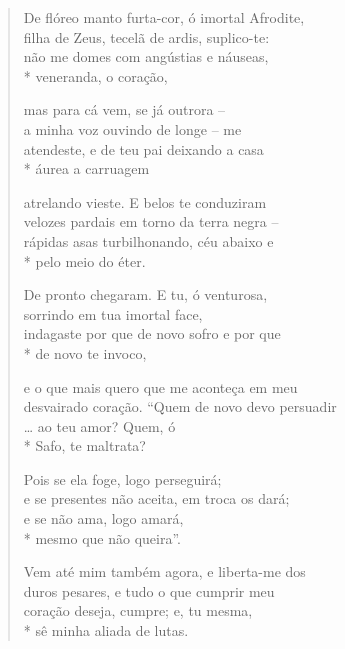 \begin{verse}
De flóreo manto furta-cor, ó imortal Afrodite,\\
filha de Zeus, tecelã de ardis, suplico-te:\\
não me domes com angústias e náuseas,\\*
veneranda, o coração,

mas para cá vem, se já outrora --\\
a minha voz ouvindo de longe -- me\\
atendeste, e de teu pai deixando a casa\\*
áurea a carruagem

atrelando vieste. E belos te conduziram\\
velozes pardais em torno da terra negra --\\
rápidas asas turbilhonando, céu abaixo e\\*
pelo meio do éter.

De pronto chegaram. E tu, ó venturosa,\\
sorrindo em tua imortal face,\\
indagaste por que de novo sofro e por que\\*
de novo te invoco,

e o que mais quero que me aconteça em meu\\
desvairado coração. ``Quem de novo devo persuadir\\
\ldots{} ao teu amor? Quem, ó\\*
Safo, te maltrata?

Pois se ela foge, logo perseguirá;\\
e se presentes não aceita, em troca os dará;\\
e se não ama, logo amará,\\*
mesmo que não queira''.

Vem até mim também agora, e liberta-me dos\\
duros pesares, e tudo o que cumprir meu\\
coração deseja, cumpre; e, tu mesma,\\*
sê minha aliada de lutas.
\end{verse}

